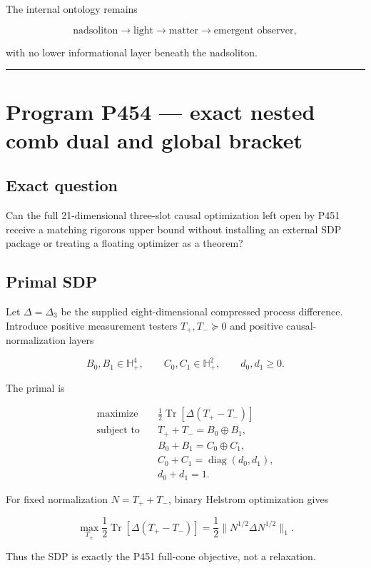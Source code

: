 \documentclass[11pt,a4paper,openany]{report}
\begin{document}
The internal ontology remains

\[
\text{nadsoliton}\to\text{light}\to\text{matter}
\to\text{emergent observer},
\]

with no lower informational layer beneath the nadsoliton.

\par\medskip\hrule\medskip

\chapter{Program P454 --- exact nested comb dual and global bracket}

\section{Exact question}

Can the full 21-dimensional three-slot causal optimization left open by P451 receive a matching rigorous upper bound without installing an external SDP package or treating a floating optimizer as a theorem?

\section{Primal SDP}

Let \(\Delta=\Delta_3\) be the supplied eight-dimensional compressed process difference. Introduce positive measurement testers \(T_+,T_-\succeq0\) and positive causal-normalization layers

\[
B_0,B_1\in\mathbb H_+^4,
\qquad
C_0,C_1\in\mathbb H_+^2,
\qquad
d_0,d_1\ge0.
\]

The primal is

\[
\begin{aligned}
\text{maximize}\quad &
\frac12\operatorname{Tr}\!\left[\Delta(T_+-T_-)\right]\\
\text{subject to}\quad &
T_++T_-=B_0\oplus B_1,\\
&B_0+B_1=C_0\oplus C_1,\\
&C_0+C_1=\operatorname{diag}(d_0,d_1),\\
&d_0+d_1=1.
\end{aligned}
\]

For fixed normalization \(N=T_++T_-\), binary Helstrom optimization gives

\[
\max_{T_\pm}\frac12\operatorname{Tr}[\Delta(T_+-T_-)]
=\frac12\lVert N^{1/2}\Delta N^{1/2}\rVert_1.
\]

Thus the SDP is exactly the P451 full-cone objective, not a relaxation.
\end{document}
